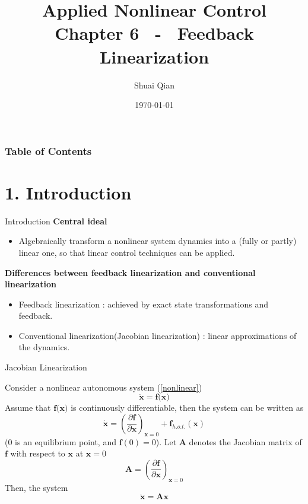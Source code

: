\documentclass{beamer}
\title{Applied Nonlinear Control \\
        \large Chapter 6 ~-~ Feedback Linearization}
\author{\large Shuai Qian}
\date{\today}
\institute{School of Automation \\
        Nanjing University of Science and Technology}
\begin{document}
  \maketitle

  \begin{frame}
  \addtocounter{framenumber}{-2}
  \frametitle{Table of Contents}
  \thispagestyle{empty}
  \tableofcontents
  \end{frame}


  \section{1. Introduction}

  \begin{frame}{Introduction}
    \textbf{Central ideal}
    \begin{itemize}
      \item Algebraically transform a nonlinear system dynamics into a (fully or partly) linear one, so that linear control techniques can be applied.
    \end{itemize}

    \textbf{Differences between feedback linearization and conventional linearization}
    \begin{itemize}
      \item Feedback linearization : achieved by exact state transformations and feedback.
      \item Conventional linearization(Jacobian linearization) : linear approximations of the dynamics.
    \end{itemize}
   \end{frame}


   \begin{frame}{Jacobian Linearization}

    Consider a nonlinear autonomous system (\ref{nonlinear})
    \begin{equation}\label{nonlinear}
      \dot{\textbf{x}} = \textbf{f(x)}
    \end{equation}
    Assume that $\textbf{f(x)}$ is continuously differentiable,
    then the system can be written as
    $$
    \dot{\textbf{x}} = (\frac{\partial \textbf{f}}{\partial \textbf{x}})_{\textbf{x}=0} + \textbf{f}_{h.o.t.}(\textbf{x})
    $$
    (0 is an equilibrium point, and $\textbf{f}(0) = 0$).
    Let $\textbf{A}$ denotes the Jacobian matrix of $\textbf{f}$ with respect to $\textbf{x}$ at $\textbf{x}=0$
    $$
    \textbf{A} = (\frac{\partial \textbf{f}}{\partial \textbf{x}})_{\textbf{x}=0}
    $$
    Then, the system
    $$
    \dot{\textbf{x}} = \textbf{Ax}
    $$
   \end{frame}
\end{document}

